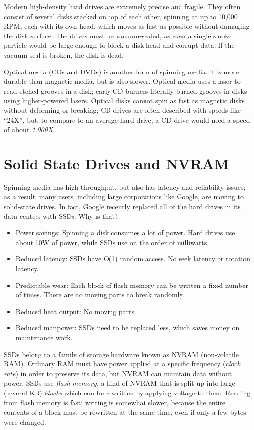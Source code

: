 \documentclass[twoside]{article}
\begin{document}
Modern high-density hard drives are extremely precise and fragile. They often consist of several disks stacked on top of each other, spinning at up to 10,000 RPM, each with its own head, which moves as fast as possible without damaging the disk surface. The drives must be vacuum-sealed, as even a single smoke particle would be large enough to block a disk head and corrupt data. If the vacuum seal is broken, the disk is dead.

Optical media (CDs and DVDs) is another form of spinning media: it is more durable than magnetic media, but is also slower. Optical media uses a laser to read etched grooves in a disk; early CD burners literally burned grooves in disks using higher-powered lasers. Optical disks cannot spin as fast as magnetic disks without deforming or breaking; CD drives are often described with speeds like ``24X'', but, to compare to an average hard drive, a CD drive would need a speed of about \emph{1,000X}.

\section{Solid State Drives and NVRAM}

Spinning media has high throughput, but also has latency and reliability issues; as a result, many users, including large corporations like Google, are moving to solid-state drives. In fact, Google recently replaced all of the hard drives in its data centers with SSDs. Why is that?

\begin{itemize}
  \item Power savings: Spinning a disk consumes a lot of power. Hard drives use about 10W of power, while SSDs use on the order of milliwatts.
  \item Reduced latency: SSDs have O(1) random access. No seek latency or rotation latency.
  \item Predictable wear: Each block of flash memory can be written a fixed number of times. There are no moving parts to break randomly.
  \item Reduced heat output: No moving parts.
  \item Reduced manpower: SSDs need to be replaced less, which saves money on maintenance work.
\end{itemize}

SSDs belong to a family of storage hardware known as NVRAM (non-volatile RAM). Ordinary RAM must have power applied at a specific frequency (\textit{clock rate}) in order to preserve its data, but NVRAM can maintain data without power. SSDs use \textit{flash memory}, a kind of NVRAM that is split up into large (several KB) \textit{blocks} which can be rewritten by applying voltage to them. Reading from flash memory is fast; writing is somewhat slower, because the entire contents of a block must be rewritten at the same time, even if only a few bytes were changed.
\end{document}
